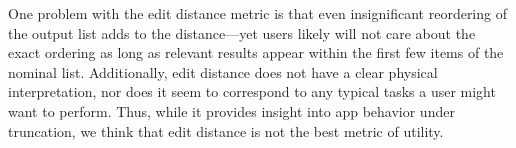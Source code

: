 \documentclass[10pt, conference, compsocconf]{IEEEtran}
\newcommand{\comment}[3][\color{red}]{{#1{[{#2}: {#3}]}}}
\newcommand{\kris}[1]{\comment[\color{orange}]{km}{#1}}
\newcommand{\jeff}[1]{\comment[\color{green}]{JSF}{#1}}
\begin{document}
One problem with the edit distance metric is that even insignificant
reordering of the output list adds to the distance---yet users likely
will not care about the exact ordering as long as relevant results
appear within the first few items of the nominal list. Additionally,
edit distance does not have a clear physical interpretation, nor does
it seem to correspond to any typical tasks a user might want to
perform. Thus, while it provides insight into app behavior under
truncation, we think that edit distance is not the best metric of
utility.



\end{document}
